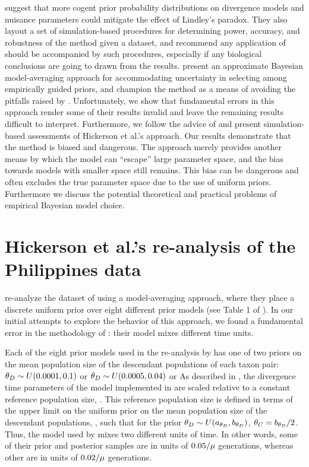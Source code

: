 \documentclass[letterpaper,12pt]{article}
\begin{document}
\begin{linenumbers}
\citet{Oaks2012} suggest that more cogent prior probability distributions on
divergence models and nuisance parameters could mitigate the effect of
Lindley's paradox.
They also layout a set of simulation-based procedures for determining power,
accuracy, and robustness of the method given a dataset, and recommend any
application of \msb should be accompanied by such procedures, especially
if any biological conclusions are going to drawn from the results.
\citet{Hickerson2013} present an approximate Bayesian model-averaging approach
for accommodating uncertainty in selecting among empirically guided priors, and
champion the method as a means of avoiding the pitfalls raised by
\citet{Oaks2012}.
Unfortunately, we show that fundamental errors in this approach render some of
their results invalid and leave the remaining results difficult to interpret.
Furthermore, we follow the advice of \citet{Oaks2012} and present
simulation-based assessments of Hickerson et al.'s \citeyear{Hickerson2013}
approach.
Our results demonstrate that the method is biased and dangerous.
The approach merely provides another means by which the model can ``escape''
large parameter space, and the bias towards models with smaller space still
remains.
This bias can be dangerous and often excludes the true parameter space due to
the use of uniform priors.
Furthermore we discuss the potential theoretical and practical problems of
empirical Bayesian model choice.




\section*{Hickerson et al.'s re-analysis of the Philippines data}
\citet{Hickerson2013} re-analyze the dataset of \citet{Oaks2012} using a
model-averaging approach, where they place a discrete uniform prior over eight
different prior models (see Table 1 of \citet{Hickerson2013}).
In our initial attempts to explore the behavior of this approach, we found
a fundamental error in the methodology of \citet{Hickerson2013}:
their model mixes different time units.

Each of the eight prior models used in the re-analysis by \citet{Hickerson2013}
has one of two priors on the mean population size of the descendant populations
of each taxon pair:
$\meanDescendantTheta{} \sim U(0.0001, 0.1)$ or
$\meanDescendantTheta{} \sim U(0.0005, 0.04)$ or
As described in \citet{Oaks2012}, the divergence time parameters of the model
implemented in \msb are scaled relative to a constant reference population
size, .
This reference population size is defined in terms of the upper limit on the
uniform prior on the mean population size of the descendant populations,
\meanDescendantTheta{}, such that for the prior $\meanDescendantTheta{} \sim
U(\uniformMin{\meanDescendantTheta{}},\uniformMax{\meanDescendantTheta{}})$,
$\myTheta{C} = \uniformMax{\meanDescendantTheta{}}/2$.
Thus, the model used by \citet{Hickerson2013} mixes two different units of
time.
In other words, some of their prior and posterior samples are in units of
$0.05/\mu$ generations, whereas other are in units of
$0.02/\mu$ generations.


\end{linenumbers}
\end{document}
